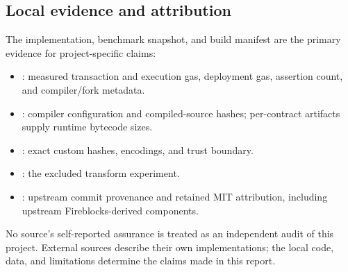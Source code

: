 \documentclass[11pt,a4paper]{article}
\begin{document}
\subsection*{Local evidence and attribution}
The implementation, benchmark snapshot, and build manifest are the primary
evidence for project-specific claims:
\begin{itemize}
\item {}: measured transaction and execution gas,
deployment gas, assertion count, and compiler/fork metadata.
\item {}: compiler configuration and compiled-source
hashes; per-contract artifacts supply runtime bytecode sizes.
\item {}: exact custom hashes, encodings, and trust boundary.
\item {}: the excluded transform experiment.
\item {}: upstream commit provenance and retained MIT
attribution, including upstream Fireblocks-derived components.
\end{itemize}
No source's self-reported assurance is treated as an independent audit of
this project. External sources describe their own implementations; the local
code, data, and limitations determine the claims made in this report.
\end{document}
